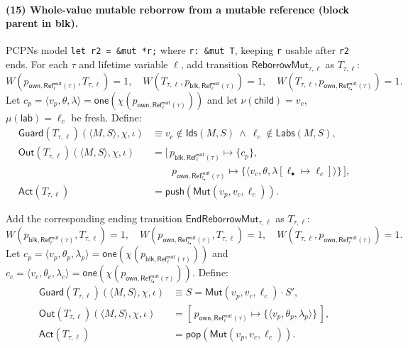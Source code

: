 \documentclass[runningheads]{llncs}
\begin{document}
\paragraph{(15) Whole-value mutable reborrow from a mutable reference (block parent in blk).}
PCPNs model \texttt{let r2 = \&mut *r;} where \texttt{r: \&mut T}, keeping \texttt{r} usable after \texttt{r2} ends. For each $\tau$ and lifetime variable $\ell$, add transition $\mathsf{ReborrowMut}_{\tau,\ell}$ as $T_{\tau,\ell}$:
\begin{equation*}
  W(p_{\mathsf{own},\mathsf{Ref}^{\mathsf{mut}}_{\ell}(\tau)},T_{\tau,\ell})=1,\quad
  W(T_{\tau,\ell},p_{\mathsf{blk},\mathsf{Ref}^{\mathsf{mut}}_{\ell}(\tau)})=1,\quad
  W(T_{\tau,\ell},p_{\mathsf{own},\mathsf{Ref}^{\mathsf{mut}}_{\ell_{\bullet}}(\tau)})=1.
\end{equation*}
Let $c_p=\langle v_p,\theta,\lambda\rangle=\mathsf{one}(\chi(p_{\mathsf{own},\mathsf{Ref}^{\mathsf{mut}}_{\ell}(\tau)}))$
and let $\nu(\mathsf{child})=v_c$, $\mu(\mathsf{lab})=\ell_c$ be fresh. Define:
\begin{align*}
\mathsf{Guard}(T_{\tau,\ell})(\langle M,S\rangle,\chi,\iota)
&\equiv v_c\notin \mathsf{Ids}(M,S)\ \wedge\ \ell_c\notin \mathsf{Labs}(M,S),\\
\mathsf{Out}(T_{\tau,\ell})(\langle M,S\rangle,\chi,\iota)
&= [\,p_{\mathsf{blk},\mathsf{Ref}^{\mathsf{mut}}_{\ell}(\tau)}\mapsto \{c_p\},\\
&\qquad p_{\mathsf{own},\mathsf{Ref}^{\mathsf{mut}}_{\ell_{\bullet}}(\tau)}\mapsto
      \{\langle v_c,\theta,\lambda[\ell_{\bullet}\mapsto \ell_c]\rangle\}\,],\\
\mathsf{Act}(T_{\tau,\ell})
&= \mathsf{push}(\mathsf{Mut}(v_p,v_c,\ell_c)).
\end{align*}

Add the corresponding ending transition $\mathsf{EndReborrowMut}_{\tau,\ell}$ as $T_{\tau,\ell}$:
\begin{equation*}
  W(p_{\mathsf{blk},\mathsf{Ref}^{\mathsf{mut}}_{\ell}(\tau)},T_{\tau,\ell})=1,\quad
  W(p_{\mathsf{own},\mathsf{Ref}^{\mathsf{mut}}_{\ell_{\bullet}}(\tau)},T_{\tau,\ell})=1,\quad
W(T_{\tau,\ell},p_{\mathsf{own},\mathsf{Ref}^{\mathsf{mut}}_{\ell}(\tau)})=1.
\end{equation*}
Let $c_p=\langle v_p,\theta_p,\lambda_p\rangle=\mathsf{one}(\chi(p_{\mathsf{blk},\mathsf{Ref}^{\mathsf{mut}}_{\ell}(\tau)}))$ and
$c_c=\langle v_c,\theta_c,\lambda_c\rangle=\mathsf{one}(\chi(p_{\mathsf{own},\mathsf{Ref}^{\mathsf{mut}}_{\ell_{\bullet}}(\tau)}))$.
Define:
\begin{align*}
\mathsf{Guard}(T_{\tau,\ell})(\langle M,S\rangle,\chi,\iota)
&\equiv S=\mathsf{Mut}(v_p,v_c,\ell_c)\cdot S',\\
\mathsf{Out}(T_{\tau,\ell})(\langle M,S\rangle,\chi,\iota)
&= [\,p_{\mathsf{own},\mathsf{Ref}^{\mathsf{mut}}_{\ell}(\tau)}\mapsto \{\langle v_p,\theta_p,\lambda_p\rangle\}\,],\\
\mathsf{Act}(T_{\tau,\ell})
&= \mathsf{pop}(\mathsf{Mut}(v_p,v_c,\ell_c)).
\end{align*}
\end{document}
